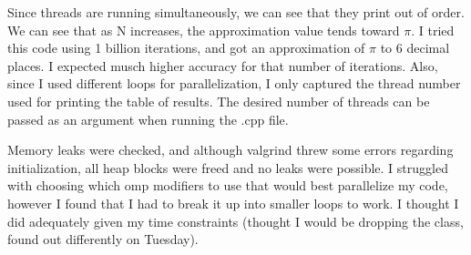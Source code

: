 \documentclass[12pt]{article}
\begin{document}
Since threads are running simultaneously, we can see that they print out of order. We can see that as N increases, the approximation value tends toward $\pi$. I tried this code using 1 billion iterations, and got an approximation of $\pi$ to 6 decimal places. I expected musch higher accuracy for that number of iterations. Also, since I used different loops for parallelization, I only captured the thread number used for printing the table of results. The desired number of threads can be passed as an argument when running the .cpp file.

Memory leaks were checked, and although valgrind threw some errors regarding initialization, all heap blocks were freed and no leaks were possible. I struggled with choosing which omp modifiers to use that would best parallelize my code, however I found that I had to break it up into smaller loops to work. I thought I did adequately given my time constraints (thought I would be dropping the class, found out differently on Tuesday).
\end{document}
